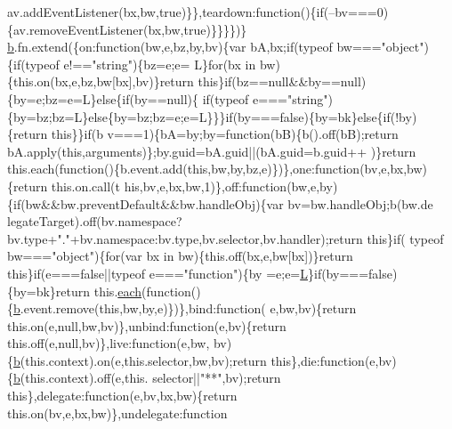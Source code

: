 \begin{DoxyCode}
      av.addEventListener(bx,bw,\textcolor{keyword}{true})\}\},teardown:\textcolor{keyword}{function}()\{\textcolor{keywordflow}{if}(--bv===0)\{av.removeEventListener(bx,bw,\textcolor{keyword}{true})\}\}\}\})\}
      \hyperlink{a00039_aa4026ad5544b958e54ce5e106fa1c805}{b}.fn.extend(\{on:function(bw,e,bz,by,bv)\{var bA,bx;if(typeof bw===\textcolor{stringliteral}{"object"})\{if(typeof e!==\textcolor{stringliteral}{"string"})\{bz=e;e=
      L\}for(bx in bw)\{this.on(bx,e,bz,bw[bx],bv)\}return this\}if(bz==null&&by==null)\{by=e;bz=e=L\}else\{if(by==null)\{
      if(typeof e===\textcolor{stringliteral}{"string"})\{by=bz;bz=L\}else\{by=bz;bz=e;e=L\}\}\}if(by===false)\{by=bk\}else\{if(!by)\{return this\}\}if(b
      v===1)\{bA=by;by=function(bB)\{b().off(bB);return bA.apply(this,arguments)\};by.guid=bA.guid||(bA.guid=b.guid++
      )\}return this.each(function()\{b.event.add(this,bw,by,bz,e)\})\},one:\textcolor{keyword}{function}(bv,e,bx,bw)\{return this.on.call(t
      his,bv,e,bx,bw,1)\},off:\textcolor{keyword}{function}(bw,e,by)\{if(bw&&bw.preventDefault&&bw.handleObj)\{var bv=bw.handleObj;b(bw.de
      legateTarget).off(bv.namespace?bv.type+\textcolor{stringliteral}{"."}+bv.namespace:bv.type,bv.selector,bv.handler);return this\}\textcolor{keywordflow}{if}(
      typeof bw===\textcolor{stringliteral}{"object"})\{for(var bx in bw)\{this.off(bx,e,bw[bx])\}\textcolor{keywordflow}{return} \textcolor{keyword}{this}\}\textcolor{keywordflow}{if}(e===\textcolor{keyword}{false}||typeof e===\textcolor{stringliteral}{"function"})\{by
      =e;e=\hyperlink{a00039_a38ee4c0b5f4fe2a18d0c783af540d253}{L}\}\textcolor{keywordflow}{if}(by===\textcolor{keyword}{false})\{by=bk\}\textcolor{keywordflow}{return} this.\hyperlink{a00039_a871ff39db627c54c710a3e9909b8234c}{each}(\textcolor{keyword}{function}()\{\hyperlink{a00039_aa4026ad5544b958e54ce5e106fa1c805}{b}.event.remove(\textcolor{keyword}{this},bw,by,e)\})\},bind:\textcolor{keyword}{function}(
      e,bw,bv)\{\textcolor{keywordflow}{return} this.on(e,null,bw,bv)\},unbind:\textcolor{keyword}{function}(e,bv)\{\textcolor{keywordflow}{return} this.off(e,null,bv)\},live:\textcolor{keyword}{function}(e,bw,
      bv)\{\hyperlink{a00039_aa4026ad5544b958e54ce5e106fa1c805}{b}(this.context).on(e,this.selector,bw,bv);\textcolor{keywordflow}{return} \textcolor{keyword}{this}\},die:\textcolor{keyword}{function}(e,bv)\{\hyperlink{a00039_aa4026ad5544b958e54ce5e106fa1c805}{b}(this.context).off(e,this.
      selector||\textcolor{stringliteral}{"**"},bv);\textcolor{keywordflow}{return} \textcolor{keyword}{this}\},delegate:\textcolor{keyword}{function}(e,bv,bx,bw)\{\textcolor{keywordflow}{return} this.on(bv,e,bx,bw)\},undelegate:\textcolor{keyword}{function}

\end{DoxyCode}
